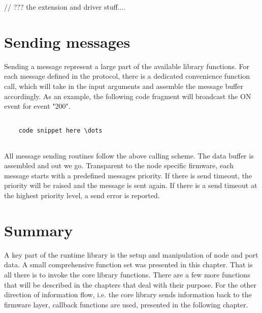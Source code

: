 // ??? the extension and driver stuff....


\section{Sending messages}

Sending a message represent a large part of the available library functions. For each message defined in the protocol, there is a dedicated convenience function call, which will take in the input arguments and assemble the message buffer accordingly. As an example, the following code fragment will broadcast the ON event for event "200".

\lstset{language=c++, style=codesnippetstyle}
\begin{lstlisting}
   
    code snippet here \dots
    
\end{lstlisting}

All message sending routines follow the above calling scheme. The data buffer is assembled and out we go. Transparent to the node specific firmware, each message starts with a predefined messages priority. If there is send timeout, the priority will be raised and the message is sent again. If there is a send timeout at the highest priority level, a send error is reported.

\section{Summary}

A key part of the runtime library is the setup and manipulation of node and port data. A small comprehensive function set was presented in this chapter. That is all there is to invoke the core library functions. There are a few more functions that will be described in the chapters that deal with their purpose. For the other direction of information flow, i.e. the core library sends information back to the firmware layer, callback functions are used, presented in the following chapter.
